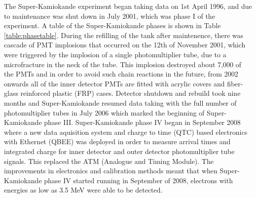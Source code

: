 The Super-Kamiokande experiment began taking data on 1st April 1996, and due to maintenance was shut down in July 2001, which was phase I of the experiment. A table of the Super-Kamiokande phases is shown in Table \ref{table:phasetable}. During the refilling of the tank after maintenence, there was cascade of PMT implosions that occurred on the 12th of November 2001, which were triggered by the implosion of a single photomultiplier tube, due to a microfracture in the neck of the tube. This implosion destroyed about 7,000 of the PMTs and in order to avoid such chain reactions in the future, from 2002 onwards all of the inner detector PMTs are fitted with acrylic covers and fiber-glass reinforced plastic (FRP) cases. Detector shutdown and rebuild took nine months and Super-Kamiokande resumed data taking with the full number of photomultiplier tubes in July 2006 which marked the beginning of Super-Kamiokande phase III. Super-Kamiokande phase IV began in September 2008 where a new data aquisition system and charge to time (QTC) based electronics with Ethernet (QBEE) was deployed in order to measure arrival times and integrated charge for inner detector and outer detector photomultiplier tube signals. This replaced the ATM (Analogue and Timing Module). The improvements in electronics and calibration methods meant that when Super-Kamiokande phase IV started running in September of 2008, electrons with energies as low as 3.5 MeV were able to be detected.

